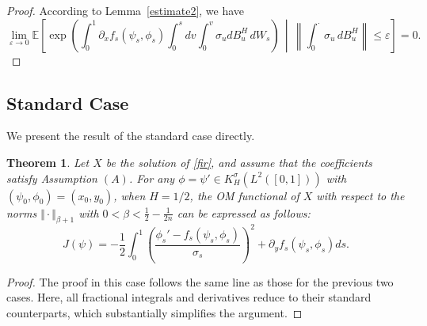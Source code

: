 \documentclass{article}
\newtheorem{theorem}{Theorem}[section]
\theoremstyle{definition}  %
\theoremstyle{plain}  %
\begin{document}
\begin{proof}
According to Lemma~\ref{estimate2}, we have
\begin{equation*}
    \lim_{\varepsilon\to 0} \mathbb{E} \left[ \exp \left( \int_0^1 \partial_x f_s(\psi_s,\phi_s) \int_0^s dv \int_0^v \sigma_u dB^H_u \, dW_s \right) \,\middle|\, \left\| \int_0^\cdot \sigma_u \, dB^H_u \right\| \leq \varepsilon \right] = 0.
\end{equation*}
\end{proof}






    \subsection{Standard Case}
    We present the result of the standard case directly.
    \begin{theorem}  \label{result3}
Let $X$ be the solution of \eqref{fir}, and assume that the coefficients satisfy Assumption \((A)\).
For any $\phi=\psi' \in K_H^\sigma(L^2([0,1]))$ with $(\psi_0,\phi_0) =(x_0,y_0)$, when $  H =1/2$, the OM functional of $X$ with respect to the norms
$\Vert \cdot \Vert_{\beta+1}$ with $0<\beta<\frac{1}{2}-\frac{1}{2n}$ can be expressed as follows:
	\begin{equation*}
	J(\psi)=-\frac{1}{2} \int_0^1 \left(\frac{\phi_s' - f_s\left(\psi_s,\phi_s\right)}{\sigma_s}\right)^2+ \partial_yf_s(\psi_s,\phi_s)ds.
	\end{equation*}
    \end{theorem}
    \begin{proof}
       The proof in this case follows the same line as those for the previous two cases. Here, all fractional integrals and derivatives reduce to their standard counterparts, which substantially simplifies the argument.


    \end{proof}
\end{document}
